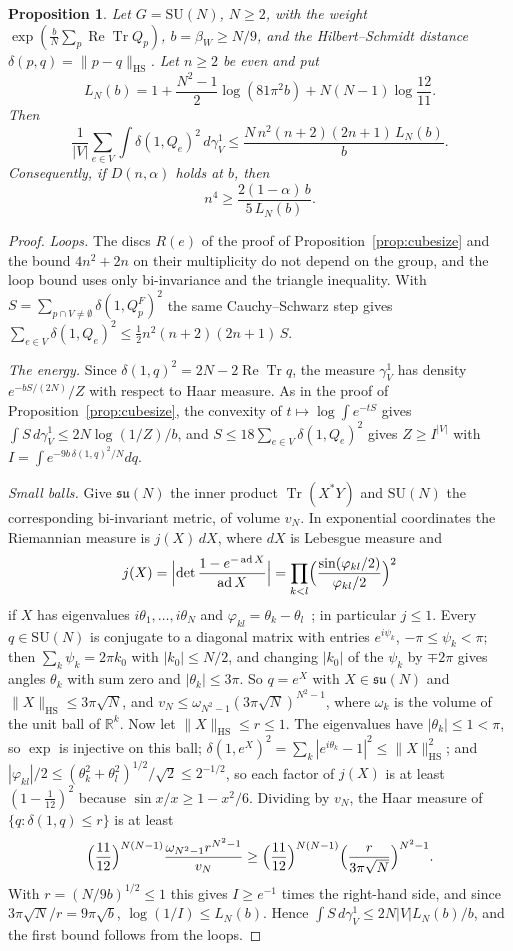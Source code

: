 \documentclass[11pt]{amsart}
\newtheorem{proposition}[theorem]{Proposition}
\theoremstyle{definition}
\theoremstyle{remark}
\numberwithin{equation}{section}
\newcommand{\R}{\mathbb{R}}
\newcommand{\SU}{\mathrm{SU}}
\newcommand{\Tr}{\operatorname{Tr}}
\newcommand{\ReTr}{\operatorname{Re}\operatorname{Tr}}
\begin{document}
\begin{proposition}\label{prop:cubesizeN}
Let $G=\SU(N)$, $N\ge2$, with the weight $\exp(\frac{b}N\sum_p\ReTr Q_p)$,
$b=\beta_W\ge N/9$, and the Hilbert--Schmidt distance
$\delta(p,q)=\|p-q\|_{\mathrm{HS}}$. Let $n\ge2$ be even and put
\[
L_N(b)=1+\frac{N^2-1}2\log(81\pi^2b)+N(N-1)\log\frac{12}{11} .
\]
Then
\[
\frac1{|V|}\sum_{e\in V}\int\delta(1,Q_e)^2\,d\gamma^1_V\le
\frac{N\,n^2(n+2)(2n+1)\,L_N(b)}b .
\]
Consequently, if $D(n,\alpha)$ holds at $b$, then
\[
n^4\ge\frac{2(1-\alpha)\,b}{5\,L_N(b)} .
\]
\end{proposition}

\begin{proof}
\emph{Loops.} The discs $R(e)$ of the proof of
Proposition~\ref{prop:cubesize} and the bound $4n^2+2n$ on their multiplicity
do not depend on the group, and the loop bound uses only bi-invariance and the
triangle inequality. With $S=\sum_{p\cap V\ne\emptyset}\delta(1,Q^F_p)^2$ the
same Cauchy--Schwarz step gives
$\sum_{e\in V}\delta(1,Q_e)^2\le\frac12n^2(n+2)(2n+1)\,S$.

\emph{The energy.} Since $\delta(1,q)^2=2N-2\ReTr q$, the measure $\gamma^1_V$
has density $e^{-bS/(2N)}/Z$ with respect to Haar measure. As in the proof of
Proposition~\ref{prop:cubesize}, the convexity of $t\mapsto\log\int e^{-tS}$
gives $\int S\,d\gamma^1_V\le2N\log(1/Z)/b$, and $S\le18\sum_{e\in V}
\delta(1,Q_e)^2$ gives $Z\ge I^{|V|}$ with $I=\int e^{-9b\,\delta(1,q)^2/N}dq$.

\emph{Small balls.} Give $\mathfrak{su}(N)$ the inner product
$\Tr(X^*Y)$ and $\SU(N)$ the corresponding bi-invariant metric, of volume
$v_N$. In exponential coordinates the Riemannian measure is $j(X)\,dX$, where
$dX$ is Lebesgue measure and
\[
j(X)=\Bigl|\det\frac{1-e^{-\operatorname{ad}X}}{\operatorname{ad}X}\Bigr|
=\prod_{k<l}\Bigl(\frac{\sin(\varphi_{kl}/2)}{\varphi_{kl}/2}\Bigr)^2
\]
if $X$ has eigenvalues $i\theta_1,\dots,i\theta_N$ and
$\varphi_{kl}=\theta_k-\theta_l$~\cite[Ch.~II,
Thm.~1.7]{Hel01}; in particular $j\le1$. Every $q\in\SU(N)$ is conjugate to a
diagonal matrix with entries $e^{i\psi_k}$, $-\pi\le\psi_k<\pi$; then
$\sum_k\psi_k=2\pi k_0$ with $|k_0|\le N/2$, and changing $|k_0|$ of the
$\psi_k$ by $\mp2\pi$ gives angles $\theta_k$ with sum zero and
$|\theta_k|\le3\pi$. So $q=e^X$ with $X\in\mathfrak{su}(N)$ and
$\|X\|_{\mathrm{HS}}\le3\pi\sqrt N$, and
$v_N\le\omega_{N^2-1}(3\pi\sqrt N)^{N^2-1}$, where $\omega_k$ is the volume
of the unit ball of $\R^k$. Now let $\|X\|_{\mathrm{HS}}\le r\le1$. The
eigenvalues have $|\theta_k|\le1<\pi$, so $\exp$ is injective on this ball;
$\delta(1,e^X)^2=\sum_k|e^{i\theta_k}-1|^2\le\|X\|_{\mathrm{HS}}^2$; and
$|\varphi_{kl}|/2\le(\theta_k^2+\theta_l^2)^{1/2}/\sqrt2\le2^{-1/2}$, so each
factor of $j(X)$ is at least $(1-\frac1{12})^2$ because $\sin x/x\ge1-x^2/6$.
Dividing by $v_N$, the Haar measure of $\{q:\delta(1,q)\le r\}$ is at least
\[
\Bigl(\frac{11}{12}\Bigr)^{N(N-1)}\frac{\omega_{N^2-1}r^{N^2-1}}{v_N}\ge
\Bigl(\frac{11}{12}\Bigr)^{N(N-1)}\Bigl(\frac r{3\pi\sqrt N}\Bigr)^{N^2-1}.
\]
With $r=(N/9b)^{1/2}\le1$ this gives $I\ge e^{-1}$ times the right-hand side,
and since $3\pi\sqrt N/r=9\pi\sqrt b$, $\log(1/I)\le L_N(b)$. Hence
$\int S\,d\gamma^1_V\le2N|V|L_N(b)/b$, and the first bound follows from the
loops.


\end{proof}
\end{document}
